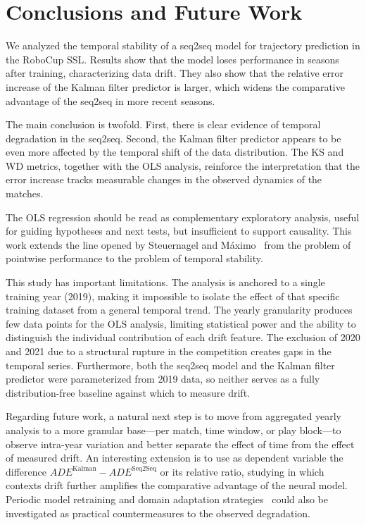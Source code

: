 \documentclass[runningheads]{llncs}
\begin{document}
\section{Conclusions and Future Work}

We analyzed the temporal stability of a seq2seq model for trajectory prediction in the RoboCup SSL. Results show that the model loses performance in seasons after training, characterizing data drift. They also show that the relative error increase of the Kalman filter predictor is larger, which widens the comparative advantage of the seq2seq in more recent seasons.

The main conclusion is twofold. First, there is clear evidence of temporal degradation in the seq2seq. Second, the Kalman filter predictor appears to be even more affected by the temporal shift of the data distribution. The KS and WD metrics, together with the OLS analysis, reinforce the interpretation that the error increase tracks measurable changes in the observed dynamics of the matches.

The OLS regression should be read as complementary exploratory analysis, useful for guiding hypotheses and next tests, but insufficient to support causality. This work extends the line opened by Steuernagel and M\'aximo~\cite{seq2seq} from the problem of pointwise performance to the problem of temporal stability.

This study has important limitations. The analysis is anchored to a single training year (2019), making it impossible to isolate the effect of that specific training dataset from a general temporal trend. The yearly granularity produces few data points for the OLS analysis, limiting statistical power and the ability to distinguish the individual contribution of each drift feature. The exclusion of 2020 and 2021 due to a structural rupture in the competition creates gaps in the temporal series. Furthermore, both the seq2seq model and the Kalman filter predictor were parameterized from 2019 data, so neither serves as a fully distribution-free baseline against which to measure drift.

Regarding future work, a natural next step is to move from aggregated yearly analysis to a more granular base---per match, time window, or play block---to observe intra-year variation and better separate the effect of time from the effect of measured drift. An interesting extension is to use as dependent variable the difference \(ADE^{\mathrm{Kalman}} - ADE^{\mathrm{Seq2Seq}}\) or its relative ratio, studying in which contexts drift further amplifies the comparative advantage of the neural model. Periodic model retraining and domain adaptation strategies~\cite{gama2014} could also be investigated as practical countermeasures to the observed degradation.
\end{document}
